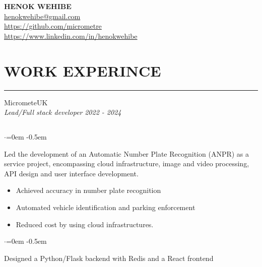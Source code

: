 \documentclass{article}
\begin{document}
\begin{center}
\textbf{\huge HENOK WEHIBE} \\
\vspace{1.5em}
\href{mailto:henokwehibe@gmail.com}{henokwehibe@gmail.com} \\
\vspace{0.5em}
\href{https://github.com/micrometre}{https://github.com/micrometre }\\
\vspace{0.5em}
\href{https://www.linkedin.com/in/henokwehibe}{https://www.linkedin.com/in/henokwehibe}
\end{center}


\section* {WORK EXPERINCE}
\vspace{-0.6em}
\hrule 
\vspace{0.4em}
{\bf}MicrometeUK \hfill {} \\%
{\em Lead/Full stack developer} \hfill {\em 2022 - 2024 } %
\subsection*{}
\vspace{-2.6em}
\begin{list}{$\cdot$}{\leftmargin=0em} %
    \itemsep -0.5em \vspace{-0.5em} %
    \item Led the development of an Automatic Number Plate Recognition (ANPR) as a service project, encompassing  cloud infrastructure, image and video  processing, API design and  user interface development.
\end{list}
\vspace{-1.6em}
\begin{itemize}
    \item Achieved  accuracy in number plate recognition  
    \item Automated vehicle identification and parking enforcement 
    \item Reduced cost by using cloud infrastructures. 
\end{itemize}
\begin{list}{$\cdot$}{\leftmargin=0em} %
    \itemsep -0.5em \vspace{-0.5em} %
    \item Designed a Python/Flask backend with Redis and a React frontend 
\end{list}
\end{document}

